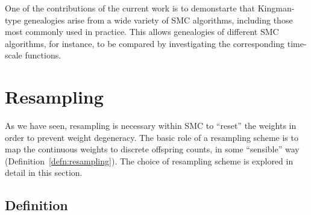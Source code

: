 One of the contributions of the current work is to demonstarte that Kingman-type genealogies arise from a wide variety of SMC algorithms, including those most commonly used in practice.
This allows genealogies of different SMC algorithms, for instance, to be compared by investigating the corresponding time-scale functions.





\section{Resampling \seb{$\sim$} }
\label{sec:resampling}
As we have seen, resampling is necessary within SMC to ``reset'' the weights in order to prevent weight degeneracy.
The basic role of a resampling scheme is to map the continuous weights to discrete offspring counts, in some ``sensible'' way (Definition~\ref{defn:resampling}).
The choice of resampling scheme is explored in detail in this section.

\subsection{Definition \seb{$\checkmark$} }

